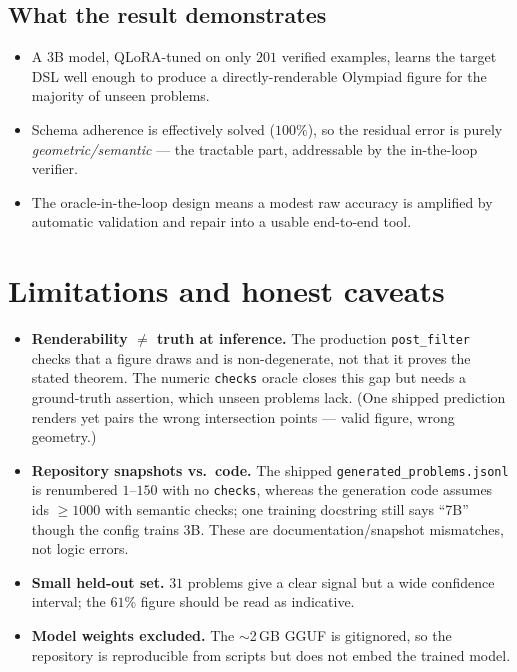 \documentclass[11pt]{article}
\newcommand{\code}[1]{\texttt{\small #1}}
\begin{document}
\subsection{What the result demonstrates}
\begin{itemize}[nosep]
  \item A $3$B model, QLoRA-tuned on only $201$ verified examples, learns the
        target DSL well enough to produce a directly-renderable Olympiad figure
        for the majority of unseen problems.
  \item Schema adherence is effectively solved ($100\%$), so the residual error
        is purely \emph{geometric/semantic} --- the tractable part, addressable
        by the in-the-loop verifier.
  \item The oracle-in-the-loop design means a modest raw accuracy is amplified
        by automatic validation and repair into a usable end-to-end tool.
\end{itemize}

\section{Limitations and honest caveats}
\begin{itemize}[nosep]
  \item \textbf{Renderability $\ne$ truth at inference.} The production
        \code{post\_filter} checks that a figure draws and is non-degenerate, not
        that it proves the stated theorem. The numeric \code{checks} oracle
        closes this gap but needs a ground-truth assertion, which unseen problems
        lack. (One shipped prediction renders yet pairs the wrong intersection
        points --- valid figure, wrong geometry.)
  \item \textbf{Repository snapshots vs.\ code.} The shipped
        \code{generated\_problems.jsonl} is renumbered $1$--$150$ with no
        \code{checks}, whereas the generation code assumes ids $\ge1000$ with
        semantic checks; one training docstring still says ``7B'' though the
        config trains $3$B. These are documentation/snapshot mismatches, not
        logic errors.
  \item \textbf{Small held-out set.} $31$ problems give a clear signal but a wide
        confidence interval; the $61\%$ figure should be read as indicative.
  \item \textbf{Model weights excluded.} The $\sim$2\,GB GGUF is gitignored, so
        the repository is reproducible from scripts but does not embed the
        trained model.
\end{itemize}
\end{document}
